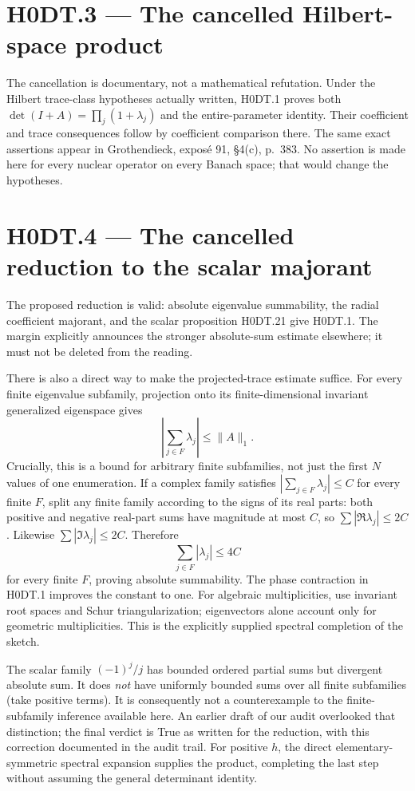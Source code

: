 \section*{H0DT.3 --- The cancelled Hilbert-space product}
The cancellation is documentary, not a mathematical refutation. Under the Hilbert trace-class hypotheses actually written, H0DT.1 proves both $\det(I+A)=\prod_j(1+\lambda_j)$ and the entire-parameter identity. Their coefficient and trace consequences follow by coefficient comparison there. The same exact assertions appear in Grothendieck, expos\'e 91, \S4(c), p.~383. No assertion is made here for every nuclear operator on every Banach space; that would change the hypotheses.

\section*{H0DT.4 --- The cancelled reduction to the scalar majorant}
The proposed reduction is valid: absolute eigenvalue summability, the radial coefficient majorant, and the scalar proposition H0DT.21 give H0DT.1. The margin explicitly announces the stronger absolute-sum estimate elsewhere; it must not be deleted from the reading.

There is also a direct way to make the projected-trace estimate suffice. For every finite eigenvalue subfamily, projection onto its finite-dimensional invariant generalized eigenspace gives
\[
 \left|\sum_{j\in F}\lambda_j\right|\le\|A\|_1.
\]
Crucially, this is a bound for arbitrary finite subfamilies, not just the first $N$ values of one enumeration. If a complex family satisfies $|\sum_{j\in F}\lambda_j|\le C$ for every finite $F$, split any finite family according to the signs of its real parts: both positive and negative real-part sums have magnitude at most $C$, so $\sum|\Re\lambda_j|\le2C$. Likewise $\sum|\Im\lambda_j|\le2C$. Therefore
\[
 \sum_{j\in F}|\lambda_j|\le4C
\]
for every finite $F$, proving absolute summability. The phase contraction in H0DT.1 improves the constant to one. For algebraic multiplicities, use invariant root spaces and Schur triangularization; eigenvectors alone account only for geometric multiplicities. This is the explicitly supplied spectral completion of the sketch.

The scalar family $(-1)^j/j$ has bounded ordered partial sums but divergent absolute sum. It does \emph{not} have uniformly bounded sums over all finite subfamilies (take positive terms). It is consequently not a counterexample to the finite-subfamily inference available here. An earlier draft of our audit overlooked that distinction; the final verdict is True as written for the reduction, with this correction documented in the audit trail. For positive $h$, the direct elementary-symmetric spectral expansion supplies the product, completing the last step without assuming the general determinant identity.

